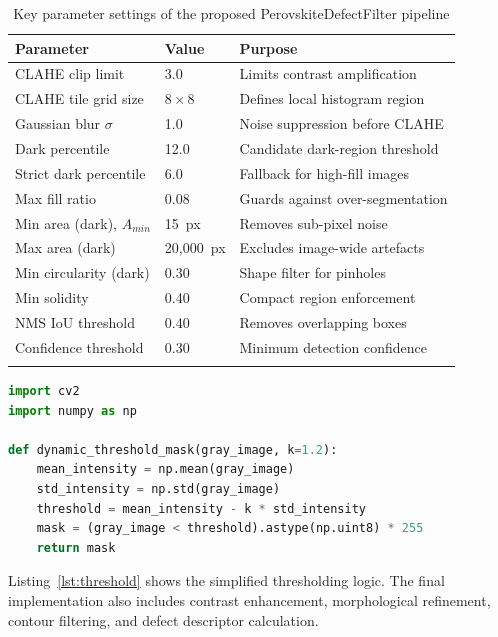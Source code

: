 \documentclass[pdflatex,sn-mathphys-num,iicol]{sn-jnl}
\theoremstyle{thmstyleone}
\theoremstyle{thmstyletwo}
\theoremstyle{thmstylethree}
\begin{document}
\begin{table}[h]
\caption{Key parameter settings of the proposed
PerovskiteDefectFilter pipeline}
\label{tab:parameters}
\begin{tabular}{@{}llp{4.5cm}@{}}
\toprule
Parameter & Value & Purpose \\
\midrule
CLAHE clip limit          & 3.0        & Limits contrast amplification \\
CLAHE tile grid size      & $8\times8$ & Defines local histogram region \\
Gaussian blur $\sigma$    & 1.0        & Noise suppression before CLAHE \\
Dark percentile           & 12.0       & Candidate dark-region threshold \\
Strict dark percentile    & 6.0        & Fallback for high-fill images \\
Max fill ratio            & 0.08       & Guards against over-segmentation \\
Min area (dark), $A_{min}$& 15~px      & Removes sub-pixel noise \\
Max area (dark)           & 20{,}000~px& Excludes image-wide artefacts \\
Min circularity (dark)    & 0.30       & Shape filter for pinholes \\
Min solidity              & 0.40       & Compact region enforcement \\
NMS IoU threshold         & 0.40       & Removes overlapping boxes \\
Confidence threshold      & 0.30       & Minimum detection confidence \\
\botrule
\end{tabular}
\end{table}

\begin{lstlisting}[language=Python,
caption={Simplified dynamic thresholding step for candidate defect extraction},
label={lst:threshold}]
import cv2
import numpy as np

def dynamic_threshold_mask(gray_image, k=1.2):
    mean_intensity = np.mean(gray_image)
    std_intensity = np.std(gray_image)
    threshold = mean_intensity - k * std_intensity
    mask = (gray_image < threshold).astype(np.uint8) * 255
    return mask
\end{lstlisting}

Listing~\ref{lst:threshold} shows the simplified thresholding logic.
The final implementation also includes contrast enhancement,
morphological refinement, contour filtering, and defect descriptor
calculation.
\end{document}
